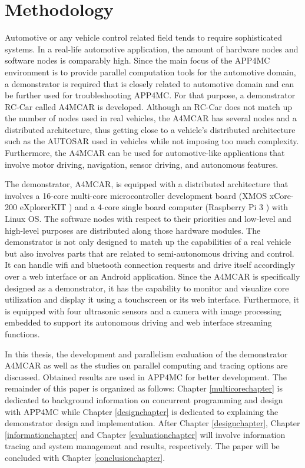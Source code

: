 \section{Methodology}

Automotive or any vehicle control related field tends to require sophisticated systems. In a real-life automotive application, the amount of hardware nodes and software nodes is comparably high. Since the main focus of the APP4MC environment is to provide parallel computation tools for the automotive domain, a demonstrator is required that is closely related to automotive domain and can be further used for troubleshooting APP4MC. For that purpose, a demonstrator RC-Car called A4MCAR is developed. Although an RC-Car does not match up the number of nodes used in real vehicles, the A4MCAR has several nodes and a distributed architecture, thus getting close to a vehicle's distributed architecture such as the AUTOSAR used in vehicles while not imposing too much complexity. Furthermore, the A4MCAR can be used for automotive-like applications that involve motor driving, navigation, sensor driving, and autonomous features.

The demonstrator, A4MCAR, is equipped with a distributed architecture that involves a 16-core multi-core microcontroller development board (XMOS xCore-200 eXplorerKIT \cite{xmoskitweb}) and a 4-core single board computer (Raspberry Pi 3 \cite{raspberrypiinfo}) with Linux OS. The software nodes with respect to their priorities and low-level and high-level purposes are distributed along those hardware modules. The demonstrator is not only designed to match up the capabilities of a real vehicle but also involves parts that are related to semi-autonomous driving and control. It can handle wifi and bluetooth connection requests and drive itself accordingly over a web interface or an Android application. Since the A4MCAR is specifically designed as a demonstrator, it has the capability to monitor and visualize core utilization and display it using a touchscreen or its web interface. Furthermore, it is equipped with four ultrasonic sensors and a camera with image processing embedded to support its autonomous driving and web interface streaming functions.

In this thesis, the development and parallelism evaluation of the demonstrator A4MCAR as well as the studies on parallel computing and tracing options are discussed. Obtained results are used in APP4MC for better development. The remainder of this paper is organized as follows: Chapter \ref{multicorechapter} is dedicated to background information on concurrent programming and design with APP4MC while Chapter \ref{designchapter} is dedicated to explaining the demonstrator design and implementation. After Chapter \ref{designchapter}, Chapter \ref{informationchapter} and Chapter \ref{evaluationchapter} will involve information tracing and system management and results, respectively. The paper will be concluded with Chapter \ref{conclusionchapter}.


